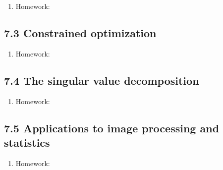 \documentclass{article}
\begin{document}
\begin{enumerate}

\item Homework: 

\end{enumerate}

\subsection{7.3 Constrained optimization}

\begin{enumerate}

\item Homework: 

\end{enumerate}

\subsection{7.4 The singular value decomposition}

\begin{enumerate}

\item Homework: 

\end{enumerate}

\subsection{7.5 Applications to image processing and statistics}

\begin{enumerate}

\item Homework: 

\end{enumerate}
\end{document}
